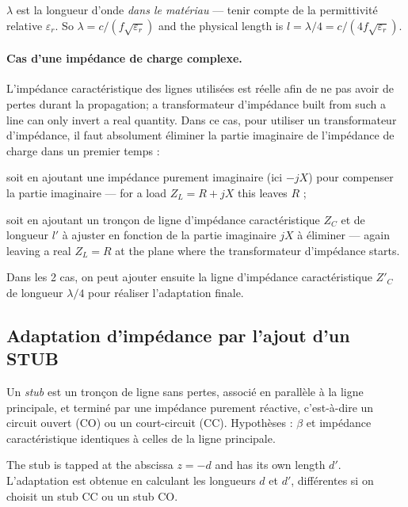 \begin{remark}[Warning]
  $\lambda$ est la longueur d'onde \emph{dans le matériau} --- tenir compte de la
  permittivité relative $\varepsilon_r$. So $\lambda = c/(f\sqrt{\varepsilon_r})$ and
  the physical length is $l = \lambda/4 = c/(4 f \sqrt{\varepsilon_r})$.
\end{remark}

\paragraph{Cas d'une impédance de charge complexe.} L'impédance caractéristique des
lignes utilisées est réelle afin de ne pas avoir de pertes durant la propagation; a
transformateur d'impédance built from such a line can only invert a real quantity.
Dans ce cas, pour utiliser un transformateur d'impédance, il faut absolument éliminer
la partie imaginaire de l'impédance de charge dans un premier temps :
\begin{subpart}
  \item soit en ajoutant une impédance purement imaginaire (ici $-jX$) pour compenser
    la partie imaginaire --- for a load $Z_L = R + jX$ this leaves $R$ ;
  \item soit en ajoutant un tronçon de ligne d'impédance caractéristique $Z_C$ et de
    longueur $l'$ à ajuster en fonction de la partie imaginaire $jX$ à éliminer ---
    again leaving a real $Z_L = R$ at the plane where the transformateur d'impédance
    starts.
\end{subpart}
Dans les 2 cas, on peut ajouter ensuite la ligne d'impédance caractéristique $Z'_C$ de
longueur $\lambda/4$ pour réaliser l'adaptation finale.

\subsection{Adaptation d'impédance par l'ajout d'un STUB}
\begin{definition}[Stub]
  Un \textit{stub} est un tronçon de ligne sans pertes, associé en parallèle à la ligne
  principale, et terminé par une impédance purement réactive, c'est-à-dire un circuit
  ouvert (CO) ou un court-circuit (CC). Hypothèses : $\beta$ et impédance
  caractéristique identiques à celles de la ligne principale.
\end{definition}

The stub is tapped at the abscissa $z = -d$ and has its own length $d'$. L'adaptation
est obtenue en calculant les longueurs $d$ et $d'$, différentes si on choisit un stub
CC ou un stub CO.

